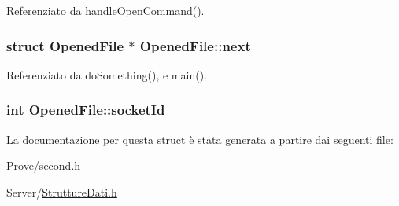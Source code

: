 Referenziato da handle\+Open\+Command().

\hypertarget{structOpenedFile_a9b8c8b995cdda6da249a6ce9a9df98b2}{}
\subsubsection[{next}]{\setlength{\rightskip}{0pt plus 5cm}struct {\bf Opened\+File} $\ast$ Opened\+File\+::next}\label{structOpenedFile_a9b8c8b995cdda6da249a6ce9a9df98b2}


Referenziato da do\+Something(), e main().

\hypertarget{structOpenedFile_a2af35018ecff06dbd349d464c815038a}{}
\subsubsection[{socket\+Id}]{\setlength{\rightskip}{0pt plus 5cm}int Opened\+File\+::socket\+Id}\label{structOpenedFile_a2af35018ecff06dbd349d464c815038a}


La documentazione per questa struct è stata generata a partire dai seguenti file\+:\begin{DoxyCompactItemize}
\item 
Prove/\hyperlink{second_8h}{second.\+h}\item 
Server/\hyperlink{StruttureDati_8h}{Strutture\+Dati.\+h}\end{DoxyCompactItemize}
